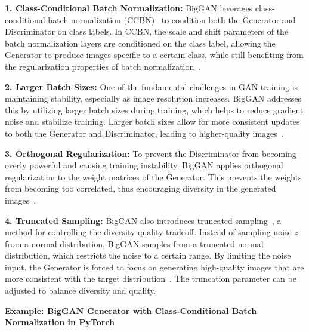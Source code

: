 \textbf{1. Class-Conditional Batch Normalization:}  
BigGAN leverages class-conditional batch normalization (CCBN)~\cite{wang2020attentive} to condition both the Generator and Discriminator on class labels. In CCBN, the scale and shift parameters of the batch normalization layers are conditioned on the class label, allowing the Generator to produce images specific to a certain class, while still benefiting from the regularization properties of batch normalization~\cite{donahue2019large}.

\textbf{2. Larger Batch Sizes:}  
One of the fundamental challenges in GAN training is maintaining stability, especially as image resolution increases. BigGAN addresses this by utilizing larger batch sizes during training, which helps to reduce gradient noise and stabilize training. Larger batch sizes allow for more consistent updates to both the Generator and Discriminator, leading to higher-quality images~\cite{donahue2019large}.

\textbf{3. Orthogonal Regularization:}  
To prevent the Discriminator from becoming overly powerful and causing training instability, BigGAN applies orthogonal regularization to the weight matrices of the Generator. This prevents the weights from becoming too correlated, thus encouraging diversity in the generated images~\cite{wang2015deep}.

\textbf{4. Truncated Sampling:}  
BigGAN also introduces truncated sampling~\cite{brock2018large}, a method for controlling the diversity-quality tradeoff. Instead of sampling noise \(z\) from a normal distribution, BigGAN samples from a truncated normal distribution, which restricts the noise to a certain range. By limiting the noise input, the Generator is forced to focus on generating high-quality images that are more consistent with the target distribution~\cite{donahue2019large}. The truncation parameter can be adjusted to balance diversity and quality.

\textbf{Example: BigGAN Generator with Class-Conditional Batch Normalization in PyTorch}

